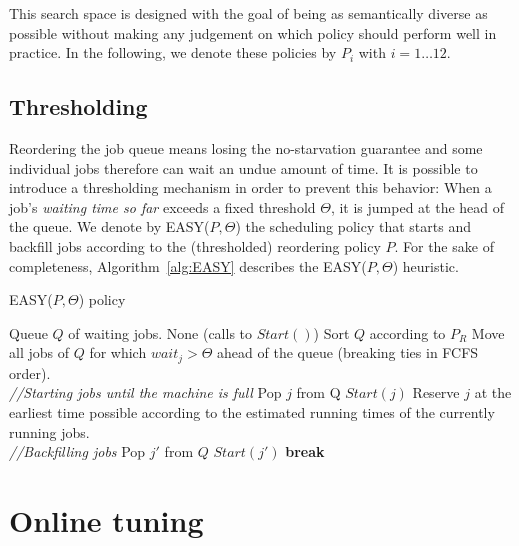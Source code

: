 \documentclass[sigconf,anonymous]{acmart}
\begin{document}
This search space is designed with the goal of being as semantically diverse as
possible without making any judgement on which policy should perform well in
practice. In the following, we denote these policies by $P_i$ with $i = 1
\ldots 12$.

\subsection{Thresholding}
\label{sub:th}

Reordering the job queue means losing the no-starvation guarantee and some
individual jobs therefore can wait an undue amount of time. It is possible to
introduce a thresholding mechanism in order to prevent this behavior: When a
job's \textit{waiting time so far} exceeds a fixed threshold $\Theta$, it is
jumped at the head of the queue. We denote by EASY($P,\Theta$) the scheduling
policy that starts and backfill jobs according to the (thresholded) reordering
policy $P$. For the sake of completeness, Algorithm~\ref{alg:EASY} describes
the EASY($P,\Theta$) heuristic.

\begin{algorithm}[]
  \caption{EASY($P,\Theta$) policy}
  \begin{algorithmic}[1]
    \renewcommand{\algorithmicrequire}{\textbf{Input:}}
    \renewcommand{\algorithmicensure}{\textbf{Output:}}
    \REQUIRE Queue $Q$ of waiting jobs.
    \ENSURE None (calls to $Start()$)
    \STATE Sort $Q$ according to $P_R$
    \STATE Move all jobs of $Q$ for which $wait_j > \Theta$ ahead
    of the queue (breaking ties in FCFS order).
    \\ \textit{//Starting jobs until the machine is full}
    \STATE Pop $j$ from Q
    \STATE $Start(j)$
    \ELSE
    \STATE Reserve $j$ at the earliest
    time possible according to the estimated running times
    of the currently running jobs.
    \\ \textit{//Backfilling jobs}
    \STATE Pop $j'$ from $Q$
    \STATE $Start(j')$
    \ENDIF
    \ENDFOR
    \STATE \textbf{break}
    \ENDIF
    \ENDFOR
  \end{algorithmic}
  \label{alg:EASY}
\end{algorithm}


\section{Online tuning}
\label{sec:online}
\end{document}
